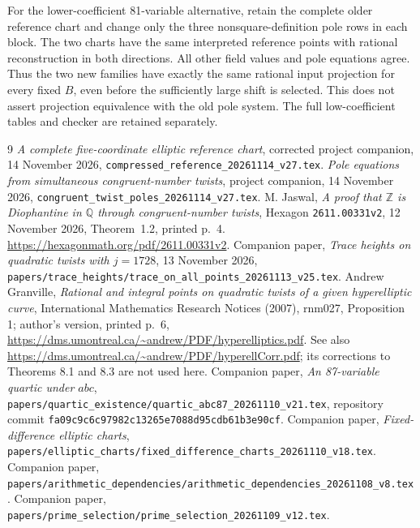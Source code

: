 \documentclass[11pt,a4paper]{article}
\newcommand{\Q}{\mathbb Q}\newcommand{\Z}{\mathbb Z}\DeclareMathOperator{\Tr}{Tr}\DeclareMathOperator{\Nm}{Nm}\DeclareMathOperator{\rad}{rad}
\begin{document}
For the lower-coefficient 81-variable alternative, retain the complete
older reference chart and change only the three nonsquare-definition
pole rows in each block. The two charts have the same interpreted
reference points with rational reconstruction in both directions.
All other field values and pole equations agree. Thus the two new
families have exactly the same rational input projection for every
fixed $B$, even before the sufficiently large shift is selected.
This does not assert projection equivalence with the old pole system.
The full low-coefficient tables and checker are retained separately.

\begin{thebibliography}{9}
 \emph{A complete five-coordinate elliptic reference chart},
corrected project companion, 14 November 2026,
\nolinkurl{compressed_reference_20261114_v27.tex}.
 \emph{Pole equations from simultaneous congruent-number twists},
project companion, 14 November 2026,
\nolinkurl{congruent_twist_poles_20261114_v27.tex}.
 M. Jaswal, \emph{A proof that $\Z$ is Diophantine in $\Q$
through congruent-number twists}, Hexagon \texttt{2611.00331v2},
12 November 2026, Theorem~1.2, printed p.~4.
\url{https://hexagonmath.org/pdf/2611.00331v2}.
 Companion paper, \emph{Trace heights on quadratic
twists with $j=1728$}, 13 November 2026,
\nolinkurl{papers/trace_heights/trace_on_all_points_20261113_v25.tex}.
 Andrew Granville, \emph{Rational and integral points
on quadratic twists of a given hyperelliptic curve}, International
Mathematics Research Notices (2007), rnm027, Proposition 1; author's
version, printed p.~6, \url{https://dms.umontreal.ca/~andrew/PDF/hyperelliptics.pdf}.
See also \url{https://dms.umontreal.ca/~andrew/PDF/hyperellCorr.pdf};
its corrections to Theorems 8.1 and 8.3 are not used here.
 Companion paper, \emph{An 87-variable quartic under
$abc$}, \nolinkurl{papers/quartic_existence/quartic_abc87_20261110_v21.tex},
repository commit \texttt{fa09c9c6c97982c13265e7088d95cdb61b3e90cf}.
 Companion paper, \emph{Fixed-difference elliptic
charts}, \nolinkurl{papers/elliptic_charts/fixed_difference_charts_20261110_v18.tex}.
 Companion paper,
\nolinkurl{papers/arithmetic_dependencies/arithmetic_dependencies_20261108_v8.tex}.
 Companion paper,
\nolinkurl{papers/prime_selection/prime_selection_20261109_v12.tex}.
\end{thebibliography}
\end{document}
